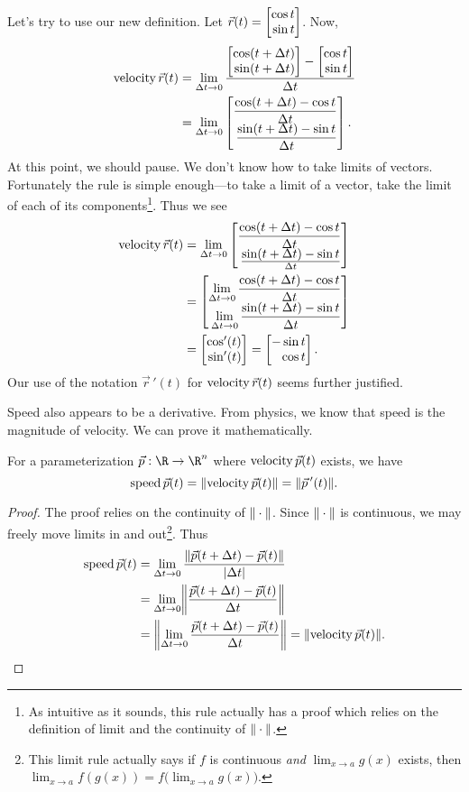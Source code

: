 Let's try to use our new definition.  Let $\vec r(t) = \mat{\cos t\\\sin t}$.  Now,
\begin{align*}
	\Vel \vec r(t) &=\lim_{\Delta t\to 0} \frac{\mat{\cos(t+\Delta t)\\\sin(t+\Delta t)} - \mat{\cos t\\\sin t}}{\Delta t}\\
	&=\lim_{\Delta t\to 0} \mat{
		\displaystyle\frac{\cos(t+\Delta t)-\cos t}{\Delta t} \\\displaystyle\frac{\sin(t+\Delta t)-\sin t}{\Delta t}
		}.
\end{align*}
At this point, we should pause.  We don't know how to take limits of vectors.  Fortunately the rule
is simple enough---to take a limit of a vector, take the limit of each of its components\footnote{
	As intuitive as it sounds, this rule actually has a proof which relies on the definition
	of limit and the continuity of $\lVert\:\cdot\:\rVert$.
}.  Thus we see
\begin{align*}
	\Vel \vec r(t) 
	&=\lim_{\Delta t\to 0} \mat{
		\displaystyle\frac{\cos(t+\Delta t)-\cos t}{\Delta t} \\\frac{\displaystyle\sin(t+\Delta t)-\sin t}{\Delta t}}\\
	&=\mat{
		\displaystyle\lim_{\Delta t\to 0} \frac{\cos(t+\Delta t)-\cos t}{\Delta t} \\\displaystyle\lim_{\Delta t\to 0} \frac{\sin(t+\Delta t)-\sin t}{\Delta t}
		}\\
	&=\mat{\cos'(t)\\\sin'(t)} = \mat{-\sin t\\\cos t}.
\end{align*}
Our use of the notation $\vec r\,'(t)$ for $\operatorname{velocity} \vec r(t)$ seems further justified.

Speed also appears to be a derivative.  From physics, we know that speed is the magnitude of 
velocity.  We can prove it mathematically.
\begin{theorem}
	For a parameterization $\vec p:\R\to\R^n$ where $\operatorname{velocity} \vec p(t)$
	exists, we have
	\[
		\operatorname{speed} \vec p(t) = \lVert\operatorname{velocity} \vec p(t)\rVert = \lVert\vec p\,'(t)\rVert.
	\]
\end{theorem}
\begin{proof}
	The proof relies on the continuity of $\lVert\:\cdot\:\rVert$.  Since $\lVert\:\cdot\:\rVert$
	is continuous, we may freely move limits in and out\footnote{
		This limit rule actually says if $f$ is continuous 
		\emph{and} $\lim_{x\to a} g(x)$ exists, then $\lim_{x\to a}f(g(x))
		=f\big(\lim_{x\to a}g(x)\big)$.}.  Thus
	\begin{align*}
		\Speed \vec p(t) &= \lim_{\Delta t\to 0} \frac{\norm{\vec p(t+\Delta t) - \vec p(t)}}{\abs{\Delta t}}\\
		&= \lim_{\Delta t\to 0} \norm*{\frac{\vec p(t+\Delta t) - \vec p(t)}{\Delta t}}\\
		&=\norm*{\lim_{\Delta t\to 0} \frac{\vec p(t+\Delta t) - \vec p(t)}{\Delta t}}
		=\norm{\Vel \vec p(t)}.
	\end{align*}
\end{proof}


